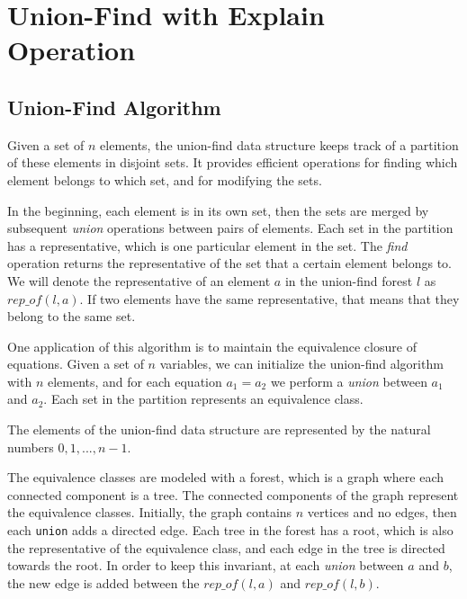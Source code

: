 
\chapter{Union-Find with Explain Operation}\label{chapter:union_find}

\section{Union-Find Algorithm}
\label{section:uf-algorithm}

Given a set of $n$ elements, the union-find data structure keeps track of a partition of these elements in disjoint sets. It provides efficient operations for finding which element belongs to which set, and for modifying the sets.

In the beginning, each element is in its own set, then the sets are merged by subsequent \emph{union} operations between pairs of elements. Each set in the partition has a representative, which is one particular element in the set. The \emph{find} operation returns the representative of the set that a certain element belongs to. We will denote the representative of an element $a$ in the union-find forest $l$ as $rep\_of(l, a)$. If two elements have the same representative, that means that they belong to the same set.

One application of this algorithm is to maintain the equivalence closure of equations. Given a set of $n$ variables, we can initialize the union-find algorithm with $n$ elements, and for each equation $a_1 = a_2$ we perform a \emph{union} between $a_1$ and $a_2$. Each set in the partition represents an equivalence class.

The elements of the union-find data structure are represented by the natural numbers $0,1,...,n-1$.

The equivalence classes are modeled with a forest, which is a graph where each connected component is a tree. The connected components of the graph represent the equivalence classes. Initially, the graph contains $n$ vertices and no edges, then each \lstinline{union} adds a directed edge.  Each tree in the forest has a root, which is also the representative of the equivalence class, and each edge in the tree is directed towards the root. In order to keep this invariant, at each \emph{union} between $a$ and $b$, the new edge is added between the $rep\_of(l,a)$ and $rep\_of(l, b)$.

